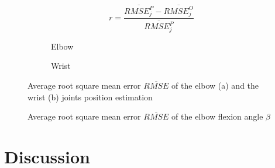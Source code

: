 \documentclass[sensors,article,submit,moreauthors,pdftex,10pt,a4paper]{mdpi}
\begin{document}
\begin{equation}
	r = \frac{\overline{RMSE^P_j} - \overline{RMSE^O_j}}{\overline{RMSE^P_j}}
	\label{eq:results:comparison}
\end{equation}
		
\begin{figure}[H] %
	\centering
	\begin{subfigure}[b]{0.49\textwidth}
		\centering
		
		\caption{Elbow}
		\label{fig:results:positionError:a}
	\end{subfigure} \hfill
	\begin{subfigure}[b]{0.49\textwidth}
		\centering
		
		\caption{Wrist}
		\label{fig:results:positionError:b}
	\end{subfigure}
	\caption{Average root square mean error $\overline{RMSE}$ of the elbow (a) and the wrist (b) joints position estimation}
	\label{fig:results:positionError}
\end{figure}   
		
\begin{figure}[H] %
	\centering
	
	\caption{Average root square mean error $\overline{RMSE}$ of the elbow flexion angle $\beta$}
	\label{fig:results:elbowAngleError}
\end{figure}
		
\section{Discussion}
		
\end{document}
